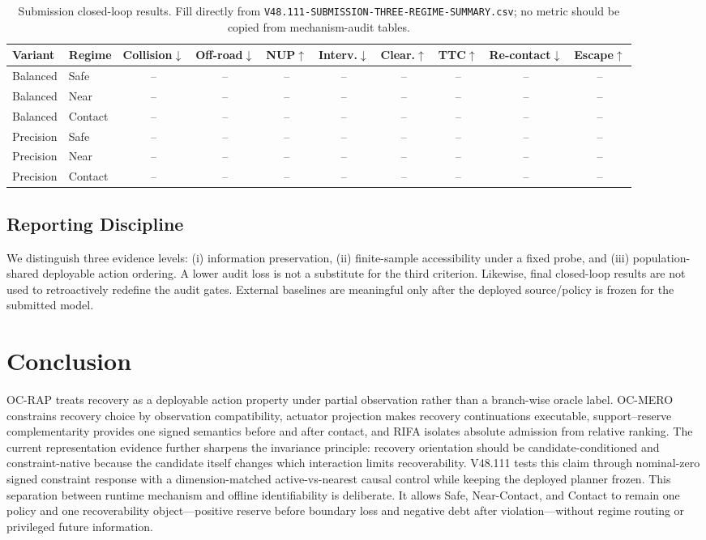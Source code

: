 \documentclass[conference]{IEEEtran}
\begin{document}
\begin{table}[t]
\centering
\caption{Submission closed-loop results. Fill directly from \texttt{V48.111-SUBMISSION-THREE-REGIME-SUMMARY.csv}; no metric should be copied from mechanism-audit tables.}
\label{tab:main_results}
\setlength{\tabcolsep}{4pt}
\begin{tabular}{llcccccccc}
\toprule
Variant & Regime & Collision$\downarrow$ & Off-road$\downarrow$ & NUP$\uparrow$ & Interv.$\downarrow$ & Clear.$\uparrow$ & TTC$\uparrow$ & Re-contact$\downarrow$ & Escape$\uparrow$ \\
\midrule
Balanced & Safe & -- & -- & -- & -- & -- & -- & -- & -- \\
Balanced & Near & -- & -- & -- & -- & -- & -- & -- & -- \\
Balanced & Contact & -- & -- & -- & -- & -- & -- & -- & -- \\
Precision & Safe & -- & -- & -- & -- & -- & -- & -- & -- \\
Precision & Near & -- & -- & -- & -- & -- & -- & -- & -- \\
Precision & Contact & -- & -- & -- & -- & -- & -- & -- & -- \\
\bottomrule
\end{tabular}
\end{table}

\subsection{Reporting Discipline}
We distinguish three evidence levels: (i) information preservation, (ii) finite-sample accessibility under a fixed probe, and (iii) population-shared deployable action ordering. A lower audit loss is not a substitute for the third criterion. Likewise, final closed-loop results are not used to retroactively redefine the audit gates. External baselines are meaningful only after the deployed source/policy is frozen for the submitted model.

\section{Conclusion}
\label{sec:conclusion}
OC-RAP treats recovery as a deployable action property under partial observation rather than a branch-wise oracle label. OC-MERO constrains recovery choice by observation compatibility, actuator projection makes recovery continuations executable, support--reserve complementarity provides one signed semantics before and after contact, and RIFA isolates absolute admission from relative ranking. The current representation evidence further sharpens the invariance principle: recovery orientation should be candidate-conditioned and constraint-native because the candidate itself changes which interaction limits recoverability. V48.111 tests this claim through nominal-zero signed constraint response with a dimension-matched active-vs-nearest causal control while keeping the deployed planner frozen. This separation between runtime mechanism and offline identifiability is deliberate. It allows Safe, Near-Contact, and Contact to remain one policy and one recoverability object---positive reserve before boundary loss and negative debt after violation---without regime routing or privileged future information.
\end{document}
